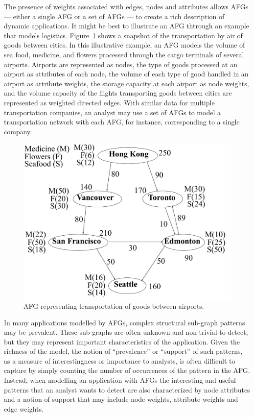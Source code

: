 The presence of weights associated with edges, nodes and attributes allows AFGs --- either a single AFG or a set of AFGs --- to create a rich description of dynamic applications. It might be best to illustrate an AFG thtrough an example that models logistics. Figure~\ref{fig:Airport} shows a snapshot of the transportation by air of goods between cities. In this illustrative example, an AFG models the volume of sea food, medicine, and flowers processed through the cargo terminals of several airports. Airports are represented as nodes, the type of goods processed at an airport as attributes of each node, the volume of each type of good handled in an airport as attribute weights, the storage capacity at each airport as node weights, and the volume capacity of the flights transporting goods between cities are represented as weighted directed edges. With similar data for multiple transportation companies, an analyst may use a set of AFGs to model a transportation network with each AFG, for instance, corresponding to a single company.  

\begin{figure}[h!]
\centering
  \includegraphics[scale=0.2]{figures/attributed_flow_graph_airport2.pdf}
    \caption{AFG representing transportation of goods between airports.}
    \label{fig:Airport}  
\end{figure}

In many applications modelled by AFGs, complex structural sub-graph patterns may be prevalent. These sub-graphs are often unknown and non-trivial to detect, but they may represent important characteristics of the application. Given the richness of the model, the notion of ``prevalence'' or ``support'' of such patterns, as a measure of interestingness or importance to analysts, is often difficult to capture by simply counting the number of occurrences of the pattern in the AFG. Instead, when modelling an application with AFGs the interesting and useful patterns that an analyst wants to detect are also characterized by node attributes and a notion of support that may include node weights, attribute weights and edge weights. 

